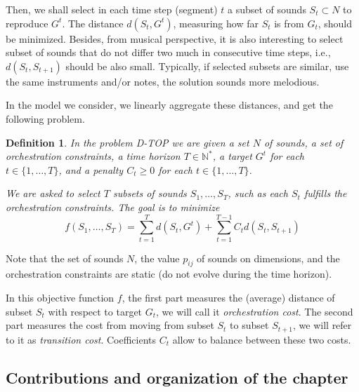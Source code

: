 \documentclass[a4paper]{book}
\newtheorem{definition}{Definition}
\newcommand{\dyn}{{\sc D-TOP }}
\begin{document}
Then, we shall select in each time step (segment) $t$ a subset of sounds $S_t\subset N$ to reproduce $G^t$. The distance $d(S_t,G^t)$, measuring how far $S_t$ is from $G_t$, should be minimized. Besides, from musical perspective, it is also interesting to select subset of sounds that do not differ two much in consecutive time steps, i.e., $d(S_t,S_{t+1})$ should be also small. Typically, if selected subsets are similar, use the same instruments and/or notes, the solution sounds more melodious. 

In the model we consider, we linearly aggregate these distances, and get the following problem.


\begin{definition}
In the problem \dyn we are given a set $N$ of sounds, a set of orchestration constraints, a time horizon $T \in \mathbb{N}^*$, a target $G^t$ for each $t\in \{1,\dots,T\}$, and a penalty $C_t\geq 0$ for each $t\in \{1,\dots,T\}$.

We are asked to select $T$ subsets of sounds $S_{1},\dots,S_T$, such as each $S_t$ fulfills the orchestration constraints. The goal is to minimize 
$$f(S_1,\dots,S_T)=\sum_{t=1}^T d(S_t,G^t)+\sum_{t=1}^{T-1} C_t d(S_t,S_{t+1})$$

\end{definition}
Note that the set of sounds $N$, the value $p_{ij}$ of sounds on dimensions, and the orchestration constraints are static (do not evolve during the time horizon). 

In this objective function $f$, the first part measures the (average) distance of subset $S_t$ with respect to target $G_t$, we will call it {\it orchestration cost}. The second part measures  the cost from moving from subset $S_t$ to subset $S_{t+1}$, we will refer to it as {\it transition cost}. Coefficients $C_t$ allow to balance between these two costs.

\subsection{Contributions and organization of the chapter}
\end{document}
